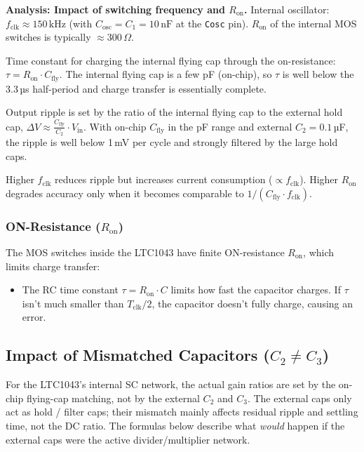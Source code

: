 \textbf{Analysis: Impact of switching frequency and $R_{\text{on}}$.}
	Internal oscillator: $f_{\text{clk}} \approx 150\,\text{kHz}$ (with $C_{\text{osc}} = C_1 = 10\,\text{nF}$ at the \texttt{Cosc} pin). $R_{\text{on}}$ of the internal MOS switches is typically $\approx 300\,\Omega$.

	Time constant for charging the internal flying cap through the on-resistance: $\tau = R_{\text{on}} \cdot C_{\text{fly}}$. The internal flying cap is a few pF (on-chip), so $\tau$ is well below the 3.3\,µs half-period and charge transfer is essentially complete.

	Output ripple is set by the ratio of the internal flying cap to the external hold cap, $\Delta V \approx \frac{C_{\text{fly}}}{C_2} \cdot V_{\text{in}}$. With on-chip $C_{\text{fly}}$ in the pF range and external $C_2 = 0.1$\,µF, the ripple is well below 1\,mV per cycle and strongly filtered by the large hold caps.

	Higher $f_{\text{clk}}$ reduces ripple but increases current consumption ($\propto f_{\text{clk}}$). Higher $R_{\text{on}}$ degrades accuracy only when it becomes comparable to $1 / (C_{\text{fly}} \cdot f_{\text{clk}})$.

\subsubsection{ON-Resistance ($R_{\text{on}}$)}

The MOS switches inside the LTC1043 have finite ON-resistance $R_{\text{on}}$, which limits charge transfer:
\begin{itemize}
	\item The RC time constant $\tau = R_{\text{on}} \cdot C$ limits how fast the capacitor charges. If $\tau$ isn't much smaller than $T_{\text{clk}} / 2$, the capacitor doesn't fully charge, causing an error.
\end{itemize}

\subsection{Impact of Mismatched Capacitors ($C_2 \neq C_3$)}

For the LTC1043's internal SC network, the actual gain ratios are set by the on-chip flying-cap matching, not by the external $C_2$ and $C_3$. The external caps only act as hold / filter caps; their mismatch mainly affects residual ripple and settling time, not the DC ratio. The formulas below describe what \emph{would} happen if the external caps were the active divider/multiplier network.

